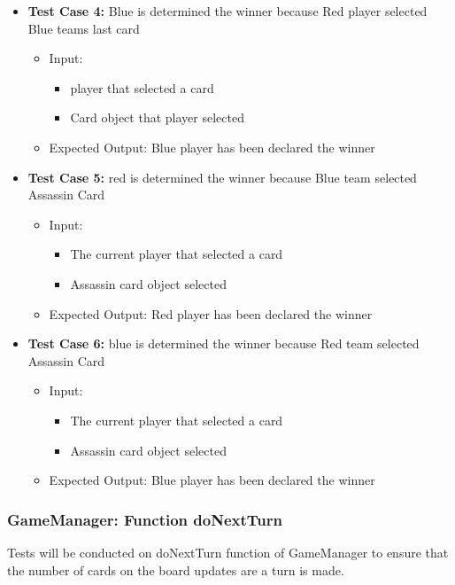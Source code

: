 \documentclass[12pt]{article}
\begin{document}
\begin{itemize}
\begin{itemize}
        \item \textbf{Test Case 4:} Blue is determined the winner because Red player selected Blue teams last card
            \begin{itemize}
            \item Input: 
                \begin{itemize}
                    \item player that selected a card
                    \item Card object that player selected
                \end{itemize}
            \item Expected Output: Blue player has been declared the winner
            \end{itemize}
        \item \textbf{Test Case 5:} red is determined the winner because Blue team selected Assassin Card
            \begin{itemize}
            \item Input: 
                \begin{itemize}
                    \item The current player that selected a card
                    \item Assassin card object selected
                \end{itemize}
            \item Expected Output: Red player has been declared the winner
            \end{itemize}
        \item \textbf{Test Case 6:} blue is determined the winner because Red team selected Assassin Card
            \begin{itemize}
            \item Input: 
                \begin{itemize}
                    \item The current player that selected a card
                    \item Assassin card object selected
                \end{itemize}
            \item Expected Output: Blue player has been declared the winner
            \end{itemize}
    \end{itemize}
\end{itemize}

\subsubsection{GameManager: Function doNextTurn}
Tests will be conducted on doNextTurn function of GameManager to ensure that the number of cards on the board updates are a turn is made.
\end{document}
